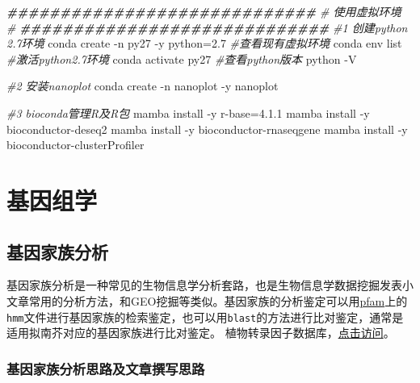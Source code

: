 \documentclass[
  10pt,
]{book}
\newenvironment{Shaded}{\begin{snugshade}}{\end{snugshade}}
\newcommand{\CommentTok}[1]{\textcolor[rgb]{0.56,0.35,0.01}{\textit{#1}}}
\newcommand{\DecValTok}[1]{\textcolor[rgb]{0.00,0.00,0.81}{#1}}
\newcommand{\DocumentationTok}[1]{\textcolor[rgb]{0.56,0.35,0.01}{\textbf{\textit{#1}}}}
\newcommand{\FloatTok}[1]{\textcolor[rgb]{0.00,0.00,0.81}{#1}}
\newcommand{\NormalTok}[1]{#1}
\newcommand{\OtherTok}[1]{\textcolor[rgb]{0.56,0.35,0.01}{#1}}
\newcommand{\SpecialCharTok}[1]{\textcolor[rgb]{0.00,0.00,0.00}{#1}}
\begin{document}
\begin{Shaded}
\begin{Highlighting}[]
\DocumentationTok{\#\#\#\#\#\#\#\#\#\#\#\#\#\#\#\#\#\#\#\#\#\#\#\#\#\#\#\#\#}
\CommentTok{\#      使用虚拟环境             \#}
\DocumentationTok{\#\#\#\#\#\#\#\#\#\#\#\#\#\#\#\#\#\#\#\#\#\#\#\#\#\#\#\#\#}
\CommentTok{\#1 创建python 2.7环境}
\NormalTok{conda create }\SpecialCharTok{{-}}\NormalTok{n py27 }\SpecialCharTok{{-}}\NormalTok{y python}\OtherTok{=}\FloatTok{2.7}
\CommentTok{\#查看现有虚拟环境}
\NormalTok{conda env list}
\CommentTok{\#激活python2.7环境}
\NormalTok{conda activate py27}
\CommentTok{\#查看python版本}
\NormalTok{python }\SpecialCharTok{{-}}\NormalTok{V}

\CommentTok{\#2 安装nanoplot}
\NormalTok{conda create }\SpecialCharTok{{-}}\NormalTok{n nanoplot }\SpecialCharTok{{-}}\NormalTok{y nanoplot}

\CommentTok{\#3 bioconda管理R及R包}
\NormalTok{mamba install }\SpecialCharTok{{-}}\NormalTok{y r}\SpecialCharTok{{-}}\NormalTok{base}\OtherTok{=}\DecValTok{4}\NormalTok{.}\FloatTok{1.1}
\NormalTok{mamba install }\SpecialCharTok{{-}}\NormalTok{y bioconductor}\SpecialCharTok{{-}}\NormalTok{deseq2}
\NormalTok{mamba install }\SpecialCharTok{{-}}\NormalTok{y bioconductor}\SpecialCharTok{{-}}\NormalTok{rnaseqgene}
\NormalTok{mamba install }\SpecialCharTok{{-}}\NormalTok{y bioconductor}\SpecialCharTok{{-}}\NormalTok{clusterProfiler}
\end{Highlighting}
\end{Shaded}

\hypertarget{genomics}{%
\chapter{基因组学}\label{genomics}}

\hypertarget{ux57faux56e0ux5bb6ux65cfux5206ux6790}{%
\section{基因家族分析}\label{ux57faux56e0ux5bb6ux65cfux5206ux6790}}

基因家族分析是一种常见的生物信息学分析套路，也是生物信息学数据挖掘发表小文章常用的分析方法，和GEO挖掘等类似。基因家族的分析鉴定可以用\href{http://pfam.xfam.org/}{pfam}上的\texttt{hmm}文件进行基因家族的检索鉴定，也可以用\texttt{blast}的方法进行比对鉴定，通常是适用拟南芥对应的基因家族进行比对鉴定。
植物转录因子数据库，\href{http://planttfdb.gao-lab.org/}{点击访问}。

\hypertarget{ux57faux56e0ux5bb6ux65cfux5206ux6790ux601dux8defux53caux6587ux7ae0ux64b0ux5199ux601dux8def}{%
\subsection{基因家族分析思路及文章撰写思路}\label{ux57faux56e0ux5bb6ux65cfux5206ux6790ux601dux8defux53caux6587ux7ae0ux64b0ux5199ux601dux8def}}
\end{document}
